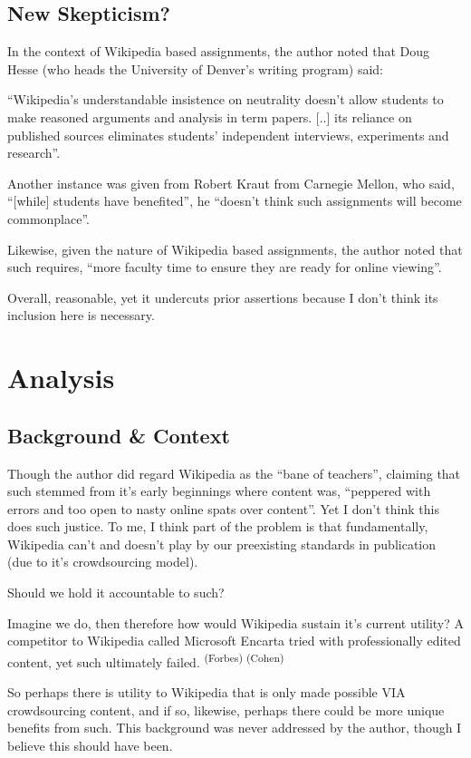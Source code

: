 \subsection{New Skepticism?}

In the context of Wikipedia based assignments, the author noted that Doug Hesse (who heads the University of Denver’s writing program) said:

``Wikipedia’s understandable insistence on neutrality doesn’t allow students to make reasoned arguments and analysis in term papers. [..] its reliance on published sources eliminates students’ independent interviews, experiments and research''.

Another instance was given from Robert Kraut from Carnegie Mellon, who said, ``[while] students have benefited'', he ``doesn’t think such assignments will become commonplace''.

Likewise, given the nature of Wikipedia based assignments, the author noted that such requires, ``more faculty time to ensure they are ready for online viewing''.

Overall, reasonable, yet it undercuts prior assertions because I don’t think its inclusion here is necessary. 


\section{Analysis}


\subsection{Background \& Context}

Though the author did regard Wikipedia as the ``bane of teachers'', claiming that such stemmed from it's early beginnings where content was, ``peppered with errors and too open to nasty online spats over content''. Yet I don't think this does such justice. To me, I think part of the problem is that fundamentally, Wikipedia can’t and doesn’t play by our preexisting standards in publication (due to it's crowdsourcing model).

Should we hold it accountable to such?

Imagine we do, then therefore how would Wikipedia sustain it's current utility?
A competitor to Wikipedia called Microsoft Encarta tried with professionally edited content, yet such ultimately failed. \textsuperscript{(Forbes) (Cohen)}

So perhaps there is utility to Wikipedia that is only made possible VIA crowdsourcing content, and if so, likewise, perhaps there could be more unique benefits from such. This background was never addressed by the author, though I believe this should have been. 


